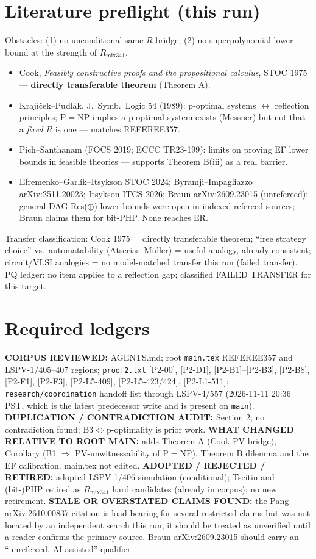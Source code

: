 \documentclass[11pt]{article}
\begin{document}
\section{Literature preflight (this run)}
Obstacles: (1) no unconditional same-$R$ bridge; (2) no superpolynomial
lower bound at the strength of $R_{\mathrm{mix341}}$.
\begin{itemize}
\item Cook, \emph{Feasibly constructive proofs and the propositional calculus},
STOC 1975 --- \textbf{directly transferable theorem} (Theorem A).
\item Krajíček--Pudlák, J.\ Symb.\ Logic 54 (1989): p-optimal systems
$\leftrightarrow$ reflection principles; P$=$NP implies a p-optimal system
exists (Messner) but not that a \emph{fixed} $R$ is one --- matches REFEREE357.
\item Pich--Santhanam (FOCS 2019; ECCC TR23-199): limits on proving EF lower
bounds in feasible theories --- supports Theorem B(iii) as a real barrier.
\item Efremenko--Garl\'ik--Itsykson STOC 2024; Byramji--Impagliazzo
arXiv:2511.20023; Itsykson ITCS 2026; Braun arXiv:2609.23015 (unrefereed):
general DAG Res($\oplus$) lower bounds were open in indexed refereed sources;
Braun claims them for bit-PHP. None reaches ER.
\end{itemize}
Transfer classification: Cook 1975 = directly transferable theorem;
``free strategy choice'' vs.\ automatability (Atserias--M\"uller) = useful
analogy, already consistent; circuit/VLSI analogies = no model-matched transfer
this run (failed transfer). PQ ledger: no item applies to a reflection gap;
classified FAILED TRANSFER for this target.

\section{Required ledgers}
\textbf{CORPUS REVIEWED:} AGENTS.md; root \texttt{main.tex} REFEREE357 and
LSPV-1/405--407 regions; \texttt{proof2.txt} [P2-00], [P2-D1], [P2-B1]--[P2-B3],
[P2-B8], [P2-F1], [P2-F3], [P2-L5-409], [P2-L5-423/424], [P2-L1-511];
\texttt{research/coordination} handoff list through LSPV-4/557 (2026-11-11 20:36
PST, which is the latest predecessor write and is present on \texttt{main}).
\textbf{DUPLICATION / CONTRADICTION AUDIT:} Section 2; no contradiction found;
B3$\iff$p-optimality is prior work.
\textbf{WHAT CHANGED RELATIVE TO ROOT MAIN:} adds Theorem A (Cook-PV bridge),
Corollary (B1 $\Rightarrow$ PV-unwitnessability of P$=$NP), Theorem B dilemma and
the EF calibration. main.tex not edited.
\textbf{ADOPTED / REJECTED / RETIRED:} adopted LSPV-1/406 simulation (conditional);
Tseitin and (bit-)PHP retired as $R_{\mathrm{mix341}}$ hard candidates (already
in corpus); no new retirement.
\textbf{STALE OR OVERSTATED CLAIMS FOUND:} the Pang arXiv:2610.00837 citation is
load-bearing for several restricted claims but was not located by an
independent search this run; it should be treated as unverified until a reader
confirms the primary source. Braun arXiv:2609.23015 should carry an
``unrefereed, AI-assisted'' qualifier.
\end{document}
